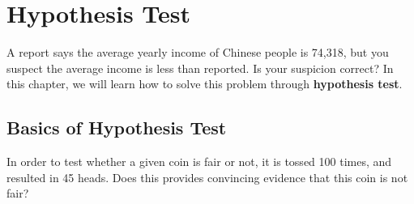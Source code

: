 \documentclass[a4paper, 12pt,twoside]{book}
\newcommand{\textyen}{\stackengine{-6pt}{=}{\large{\text{Y}}}{O}{c}{F}{T}{S}}
\begin{document}
\pagestyle{fancy}
\fancyhf{}
\renewcommand{\chaptermark}[1]{ \markboth{#1}{} }
\fancyhead[CE,CO]{\leftmark}
\fancyfoot[LE,RO]{\thepage}

\chapter{Hypothesis Test}
A report says the average yearly income of Chinese people is 74,318\textyen, but you suspect the average income is less than reported. Is your suspicion correct? In this chapter, we will learn how to solve this problem through \textbf{hypothesis test}.
\newpage

\section{Basics of Hypothesis Test}

  In order to test whether a given coin is fair or not, it is tossed 100 times, and resulted in 45 heads. Does this provides convincing evidence that this coin is not fair?\vspace{0.3cm}
\end{document}
